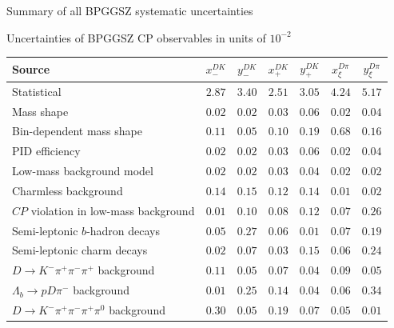 \documentclass{beamer}
\begin{document}
\begin{frame}{Summary of all BPGGSZ systematic uncertainties}
  \begin{center}
    Uncertainties of BPGGSZ CP observables in units of $10^{-2}$
  \end{center}
  \scriptsize
  \vspace{0.02cm}
  \begin{center}
    \begin{tabular}{lcccccc} 
        \hline
        Source & $x_-^{DK}$ & $y_-^{DK}$ & $x_+^{DK}$ & $y_+^{DK}$ & $x_\xi^{D\pi}$ & $y_\xi^{D\pi}$ \\
        \hline
        Statistical                                                & $2.87$ & $3.40$ & $2.51$ & $3.05$ & $4.24$ & $5.17$ \\
        \hline
        Mass shape                                                 & $0.02$ & $0.02$ & $0.03$ & $0.06$ & $0.02$ & $0.04$ \\
        Bin-dependent mass shape                                   & $0.11$ & $0.05$ & $0.10$ & $0.19$ & $0.68$ & $0.16$ \\ 
        PID efficiency                                             & $0.02$ & $0.02$ & $0.03$ & $0.06$ & $0.02$ & $0.04$ \\
        Low-mass background model                                  & $0.02$ & $0.02$ & $0.03$ & $0.04$ & $0.02$ & $0.02$ \\
        Charmless background                                       & $0.14$ & $0.15$ & $0.12$ & $0.14$ & $0.01$ & $0.02$ \\
        $C\!P$ violation in low-mass background                    & $0.01$ & $0.10$ & $0.08$ & $0.12$ & $0.07$ & $0.26$ \\
        Semi-leptonic $b$-hadron decays                            & $0.05$ & $0.27$ & $0.06$ & $0.01$ & $0.07$ & $0.19$ \\
        Semi-leptonic charm decays                                 & $0.02$ & $0.07$ & $0.03$ & $0.15$ & $0.06$ & $0.24$ \\
        $D\to K^-\pi^+\pi^-\pi^+$ background                       & $0.11$ & $0.05$ & $0.07$ & $0.04$ & $0.09$ & $0.05$ \\
        $\Lambda_b\to pD\pi^-$ background                          & $0.01$ & $0.25$ & $0.14$ & $0.04$ & $0.06$ & $0.34$ \\
        $D\to K^-\pi^+\pi^-\pi^+\pi^0$ background                  & $0.30$ & $0.05$ & $0.19$ & $0.07$ & $0.05$ & $0.01$ \\

\end{tabular}
\end{center}
\end{frame}
\end{document}
